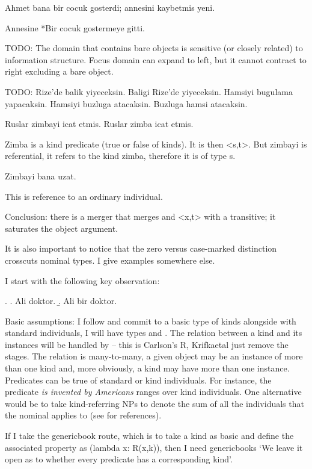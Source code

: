 \documentclass[11pt,a4paper]{article}
\begin{document}
Ahmet bana bir cocuk gosterdi; annesini kaybetmis yeni. 

Annesine *Bir cocuk gostermeye gitti.

TODO: The domain that contains bare objects is sensitive (or closely related) to information structure. Focus domain can expand to left, but it cannot contract to right excluding a bare object.

TODO: 
Rize'de balik yiyeceksin.
Baligi Rize'de yiyeceksin. 
Hamsiyi bugulama yapacaksin.
Hamsiyi buzluga atacaksin. 
Buzluga hamsi atacaksin.

Ruslar zimbayi icat etmis.
Ruslar zimba icat etmis.

Zimba is a kind predicate (true or false of kinds). It is then <s,t>. But zimbayi is referential, it refers to the kind zimba, therefore it is of type s.

Zimbayi bana uzat.

This is reference to an ordinary individual.

Conclusion: there is a merger that merges and <x,t> with a transitive; it saturates the object argument.


It is also important to notice that the zero versus case-marked distinction crosscuts nominal types. I give examples somewhere else.

I start with the following key observation:

\ex.\label{ex:doktor} 
\a. Ali doktor.
\b. Ali bir doktor.

Basic assumptions: I follow \cite[p.\ 64]{krifkaetal95} and commit to a basic type of kinds alongside with standard individuals, I will have types  and . The relation between a kind and its instances will be handled by  -- this is Carlson's R, Krifkaetal just remove the stages. The relation is many-to-many, a given object may be an instance of more than one kind and, more obviously, a kind may have more than one instance. Predicates can be true of standard or kind individuals. For instance, the predicate \textit{is invented by Americans} ranges over kind individuals. One alternative would be to take kind-referring NPs to denote the sum of all the individuals that the nominal applies to (see \cite{krifkaetal95} for references).

If I take the genericbook route, which is to take a kind as basic and define the associated property as (lambda x: R(x,k)), then I need genericbooks `We leave it open as to whether every predicate has a corresponding kind'.
\end{document}
